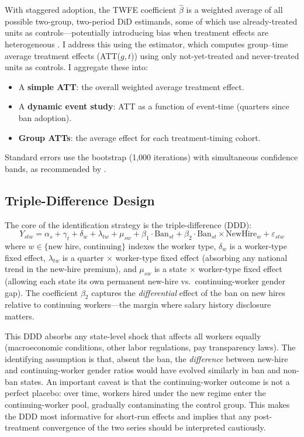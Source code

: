 \documentclass[12pt]{article}
\begin{document}
With staggered adoption, the TWFE coefficient $\hat{\beta}$ is a weighted average of all possible two-group, two-period DiD estimands, some of which use already-treated units as controls---potentially introducing bias when treatment effects are heterogeneous \citep{goodman2021difference, dechaisemartin2020two}. I address this using the \citet{callaway2021difference} estimator, which computes group--time average treatment effects (ATT($g,t$)) using only not-yet-treated and never-treated units as controls. I aggregate these into:

\begin{itemize}
  \item A \textbf{simple ATT}: the overall weighted average treatment effect.
  \item A \textbf{dynamic event study}: ATT as a function of event-time (quarters since ban adoption).
  \item \textbf{Group ATTs}: the average effect for each treatment-timing cohort.
\end{itemize}

Standard errors use the bootstrap (1,000 iterations) with simultaneous confidence bands, as recommended by \citet{callaway2021difference}.

\subsection{Triple-Difference Design}

The core of the identification strategy is the triple-difference (DDD):
\begin{equation}\label{eq:ddd}
  Y_{stw} = \alpha_s + \gamma_t + \delta_w + \lambda_{tw} + \mu_{sw} + \beta_1 \cdot \text{Ban}_{st} + \beta_2 \cdot \text{Ban}_{st} \times \text{NewHire}_w + \varepsilon_{stw}
\end{equation}
where $w \in \{\text{new hire, continuing}\}$ indexes the worker type, $\delta_w$ is a worker-type fixed effect, $\lambda_{tw}$ is a quarter $\times$ worker-type fixed effect (absorbing any national trend in the new-hire premium), and $\mu_{sw}$ is a state $\times$ worker-type fixed effect (allowing each state its own permanent new-hire vs.\ continuing-worker gender gap). The coefficient $\beta_2$ captures the \textit{differential} effect of the ban on new hires relative to continuing workers---the margin where salary history disclosure matters.

This DDD absorbs any state-level shock that affects all workers equally (macroeconomic conditions, other labor regulations, pay transparency laws). The identifying assumption is that, absent the ban, the \textit{difference} between new-hire and continuing-worker gender ratios would have evolved similarly in ban and non-ban states. An important caveat is that the continuing-worker outcome is not a perfect placebo: over time, workers hired under the new regime enter the continuing-worker pool, gradually contaminating the control group. This makes the DDD most informative for short-run effects and implies that any post-treatment convergence of the two series should be interpreted cautiously.
\end{document}
